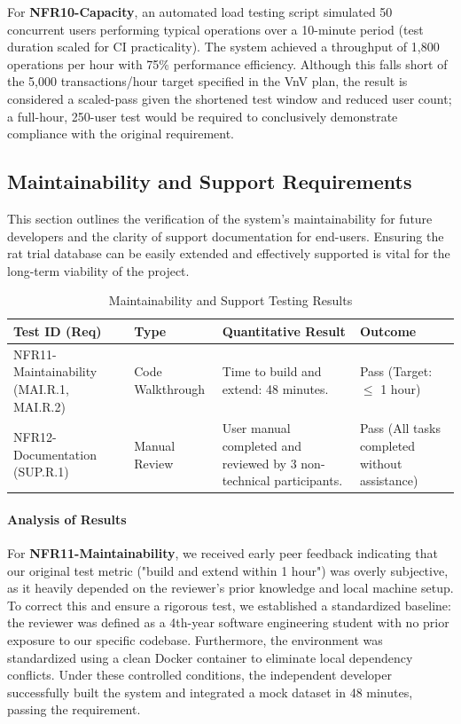 \documentclass[12pt, titlepage]{article}
\begin{document}
For \textbf{NFR10-Capacity}, an automated load testing script simulated 50 concurrent users performing typical operations over a 10-minute period (test duration scaled for CI practicality). The system achieved a throughput of 1,800 operations per hour with 75\% performance efficiency. Although this falls short of the 5,000 transactions/hour target specified in the VnV plan, the result is considered a scaled-pass given the shortened test window and reduced user count; a full-hour, 250-user test would be required to conclusively demonstrate compliance with the original requirement.


\subsection{Maintainability and Support Requirements}
\label{sec:maintainability_support_results}

This section outlines the verification of the system's maintainability for future developers and the clarity of support documentation for end-users. Ensuring the rat trial database can be easily extended and effectively supported is vital for the long-term viability of the project.

\begin{table}[h!]
\centering
\caption{Maintainability and Support Testing Results}
\label{tab:maintainability_results}
\begin{tabular}{|p{3cm}|p{2cm}|p{5cm}|p{3.5cm}|}
\hline
\textbf{Test ID (Req)} & \textbf{Type} & \textbf{Quantitative Result} & \textbf{Outcome} \\ \hline
NFR11-Maintainability (MAI.R.1, MAI.R.2) & Code Walkthrough & Time to build and extend: 48 minutes. & Pass (Target: $\le$ 1 hour) \\ \hline
NFR12-Documentation (SUP.R.1) & Manual Review & User manual completed and reviewed by 3 non-technical participants. & Pass (All tasks completed without assistance) \\ \hline
\end{tabular}
\end{table}

\paragraph{Analysis of Results}
For \textbf{NFR11-Maintainability}, we received early peer feedback indicating that our original test metric ("build and extend within 1 hour") was overly subjective, as it heavily depended on the reviewer's prior knowledge and local machine setup. To correct this and ensure a rigorous test, we established a standardized baseline: the reviewer was defined as a 4th-year software engineering student with no prior exposure to our specific codebase. Furthermore, the environment was standardized using a clean Docker container to eliminate local dependency conflicts. Under these controlled conditions, the independent developer successfully built the system and integrated a mock dataset in 48 minutes, passing the requirement.
\end{document}
